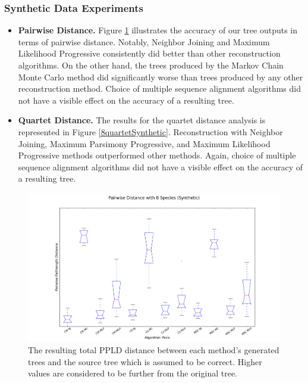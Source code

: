 \documentclass[10pt,twocolumn]{article}
\begin{document}
\subsubsection*{Synthetic Data Experiments}

\begin{itemize}
  \item \textbf{Pairwise Distance.} Figure \ref{8pairwiseSynthetic} illustrates the accuracy of our tree outputs in terms of pairwise distance. Notably, Neighbor Joining and Maximum Likelihood Progressive consistently did better than other reconstruction algorithms. On the other hand, the trees produced by the Markov Chain Monte Carlo method did significantly worse than trees produced by any other reconstruction method. Choice of multiple sequence alignment algorithms did not have a visible effect on the accuracy of a resulting tree. 
  \item \textbf{Quartet Distance.} The results for the quartet distance analysis is represented in Figure \ref{8quartetSynthetic}. Reconstruction with Neighbor Joining, Maximum Parsimony Progressive, and Maximum Likelihood Progressive methods outperformed other methods. Again, choice of multiple sequence alignment algorithms did not have a visible effect on the accuracy of a resulting tree. 
\end{itemize}

 \begin{figure} %
    \vspace{0 mm}
    \hspace{-40mm}
	\includegraphics[scale=.72]{./media/8pairwiseSynthetic.png}
	\caption{The resulting total PPLD distance between each method's generated trees and the source tree which is assumed to be correct. Higher values are considered to be further from the original tree.} %
	\label{8pairwiseSynthetic}

  \end{figure}
  
\end{document}
